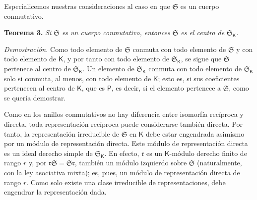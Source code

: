 Especialicemos nuestras consideraciones al caso en que \(\mathfrak S\) es un cuerpo conmutativo.

\textbf{Teorema 3.} \emph{Si \(\mathfrak S\) es un cuerpo conmutativo, entonces \(\mathfrak S\) es el centro de \(\mathfrak S_{\mathsf K}\).}

\emph{Demostración.} Como todo elemento de \(\mathfrak S\) conmuta con todo elemento de \(\mathfrak S\) y con todo elemento de \(\mathsf K\), y por tanto con todo elemento de \(\mathfrak S_{\mathsf K}\), se sigue que \(\mathfrak S\) pertenece al centro de \(\mathfrak S_{\mathsf K}\). Un elemento de \(\mathfrak S_{\mathsf K}\) conmuta con todo elemento de \(\mathfrak S_{\mathsf K}\) solo si conmuta, al menos, con todo elemento de \(\mathsf K\); esto es, si sus coeficientes pertenecen al centro de \(\mathsf K\), que es \(\mathsf P\), es decir, si el elemento pertenece a \(\mathfrak S\), como se quería demostrar.

Como en los anillos conmutativos no hay diferencia entre isomorfía recíproca y directa, toda representación recíproca puede considerarse también directa. Por tanto, la representación irreducible de \(\mathfrak S\) en \(\mathsf K\) debe estar engendrada asimismo por un módulo de representación directa. Este módulo de representación directa es un ideal derecho simple de \(\mathfrak S_{\mathsf K}\). En efecto, \(\mathfrak r\) es un \(\mathsf K\)-módulo derecho finito de rango \(r\) y, por \(\mathfrak r\mathfrak S=\mathfrak S\mathfrak r\), también un módulo izquierdo sobre \(\mathfrak S\) (naturalmente, con la ley asociativa mixta); es, pues, un módulo de representación directa de rango \(r\). Como solo existe una clase irreducible de representaciones, debe engendrar la representación dada.
